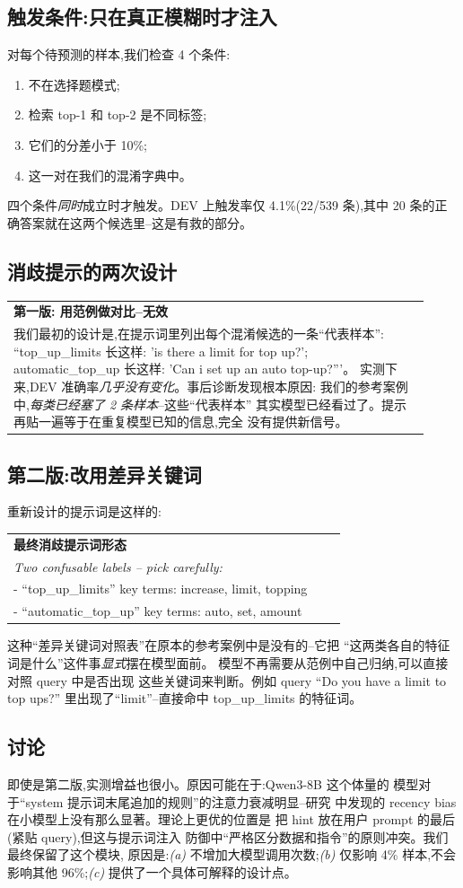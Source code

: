 \documentclass[10pt,twocolumn,letterpaper]{article}
\makeatletter
\newcommand{\failbox}[2][\textbf{失败案例}]{%
  \par\medskip\noindent
  \begin{tabular}{@{}|@{\hspace{4pt}}p{0.92\linewidth}@{\hspace{4pt}}|@{}}
  \hline
  \rule{0pt}{2.6ex}\textbf{\color{failclr}#1}\\[2pt]
  \small #2 \\[2pt]
  \hline
  \end{tabular}
  \par\medskip
}
\newcommand{\promptbox}[2][\textbf{提示词示例}]{%
  \par\medskip\noindent
  \begin{tabular}{@{}|@{\hspace{4pt}}p{0.92\linewidth}@{\hspace{4pt}}|@{}}
  \hline
  \rule{0pt}{2.6ex}\textbf{\color{promptclr}#1}\\[2pt]
  \small\itshape #2 \\[2pt]
  \hline
  \end{tabular}
  \par\medskip
}
\makeatother
\begin{document}
\subsection{触发条件:只在真正模糊时才注入}
对每个待预测的样本,我们检查 4 个条件:
\begin{enumerate}[leftmargin=*,itemsep=1pt,topsep=2pt]
\item 不在选择题模式;
\item 检索 top-1 和 top-2 是不同标签;
\item 它们的分差小于 10\%;
\item 这一对在我们的混淆字典中。
\end{enumerate}
四个条件\emph{同时}成立时才触发。DEV 上触发率仅 4.1\%(22/539
条),其中 20 条的正确答案就在这两个候选里--这是有救的部分。

\subsection{消歧提示的两次设计}

\failbox[\textbf{第一版: 用范例做对比--无效}]{%
我们最初的设计是,在提示词里列出每个混淆候选的一条``代表样本'':
``top\_up\_limits 长这样: 'is there a limit for top up?';
automatic\_top\_up 长这样: 'Can i set up an auto top-up?'''。
实测下来,DEV 准确率\emph{几乎没有变化}。事后诊断发现根本原因:
我们的参考案例中,\emph{每类已经塞了 2 条样本}--这些``代表样本''
其实模型已经看过了。提示再贴一遍等于在重复模型已知的信息,完全
没有提供新信号。
}

\subsection{第二版:改用差异关键词}
重新设计的提示词是这样的:

\promptbox[\textbf{最终消歧提示词形态}]{%
Two confusable labels -- pick carefully:\\
- ``top\_up\_limits''  key terms: increase, limit, topping\\
- ``automatic\_top\_up''  key terms: auto, set, amount
}

这种``差异关键词对照表''在原本的参考案例中是没有的--它把
``这两类各自的特征词是什么''这件事\emph{显式}摆在模型面前。
模型不再需要从范例中自己归纳,可以直接对照 query 中是否出现
这些关键词来判断。例如 query ``Do you have a limit to top ups?''
里出现了``limit''--直接命中 top\_up\_limits 的特征词。

\subsection{讨论}
即使是第二版,实测增益也很小。原因可能在于:Qwen3-8B 这个体量的
模型对于``system 提示词末尾追加的规则''的注意力衰减明显--研究
中发现的 recency bias 在小模型上没有那么显著。理论上更优的位置是
把 hint 放在用户 prompt 的最后(紧贴 query),但这与提示词注入
防御中``严格区分数据和指令''的原则冲突。我们最终保留了这个模块,
原因是:\emph{(a)} 不增加大模型调用次数;\emph{(b)} 仅影响 4\%
样本,不会影响其他 96\%;\emph{(c)} 提供了一个具体可解释的设计点。
\end{document}
